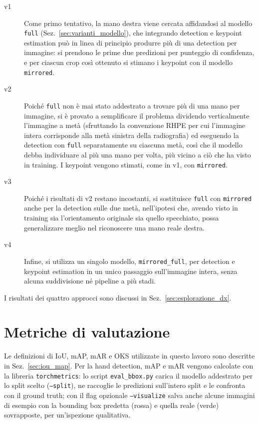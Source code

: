 \begin{description}
    \item[v1] Come primo tentativo, la mano destra viene cercata
    affidandosi al modello \texttt{full} (Sez.~\ref{sec:varianti_modello}),
    che integrando detection e keypoint estimation può in linea di
    principio produrre più di una detection per immagine: si prendono
    le prime due predizioni per punteggio di confidenza, e per ciascun
    crop così ottenuto si stimano i keypoint con il modello
    \texttt{mirrored}.

    \item[v2] Poiché \texttt{full} non è mai stato addestrato a trovare
    più di una mano per immagine, si è provato a semplificare il
    problema dividendo verticalmente l'immagine a metà (sfruttando la
    convenzione RHPE per cui l'immagine intera corrisponde alla metà
    sinistra della radiografia) ed eseguendo la detection con
    \texttt{full} separatamente su ciascuna metà, così che il modello
    debba individuare al più una mano per volta, più vicino a ciò che
    ha visto in training. I keypoint vengono stimati, come in v1, con
    \texttt{mirrored}.

    \item[v3] Poiché i risultati di v2 restano incostanti, si
    sostituisce \texttt{full} con \texttt{mirrored} anche per la
    detection sulle due metà, nell'ipotesi che, avendo visto in
    training sia l'orientamento originale sia quello specchiato, possa
    generalizzare meglio nel riconoscere una mano reale destra.

    \item[v4] Infine, si utilizza un singolo modello,
    \texttt{mirrored\_full}, per detection e keypoint estimation in un
    unico passaggio sull'immagine intera, senza alcuna suddivisione né
    pipeline a più stadi.
\end{description}

I risultati dei quattro approcci sono discussi in
Sez.~\ref{sec:esplorazione_dx}.

\section{Metriche di valutazione}
\label{sec:metriche}

Le definizioni di IoU, mAP, mAR e OKS utilizzate in questo lavoro sono
descritte in Sez.~\ref{sec:iou_map}. Per la hand detection, mAP e mAR
vengono calcolate con la libreria \texttt{torchmetrics}: lo script
\texttt{eval\_bbox.py} carica il modello addestrato per lo split scelto
(\texttt{--split}), ne raccoglie le predizioni sull'intero split e le
confronta con il ground truth; con il flag opzionale
\texttt{--visualize} salva anche alcune immagini di esempio con la
bounding box predetta (rossa) e quella reale (verde) sovrapposte, per
un'ispezione qualitativa.

